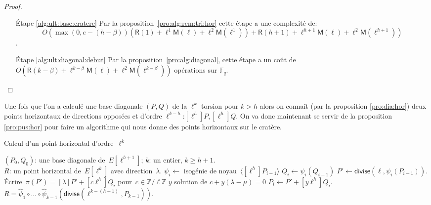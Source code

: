 \documentclass[10pt,a4paper]{book}
\theoremstyle{plain}
\theoremstyle{definition}
\theoremstyle{definition}
\theoremstyle{definition}
\theoremstyle{definition}
\theoremstyle{remark}
\theoremstyle{remark}
\theoremstyle{definition}
\begin{document}
\begin{proof}
\begin{enumerate}
\item[\'Etape \ref{alg:ult:base:cratere}] Par la proposition~\ref{pro:alg:rem:tri:hor} cette étape a une complexité de: \[O(\max(0,e-(h-\beta))(\mathsf{R}(1)+
\ell^{1}\mathsf{M}(\ell)+\ell^2 \mathsf{M}(\ell^{1}))+\mathsf{R}(h+1)+
\ell^{h+1}\mathsf{M}(\ell)+\ell^2 \mathsf{M}(\ell^{h+1}))\].

\item[\'Etape \ref{alg:ult:diagonal:debut}]	Par la proposition~\ref{pro:alg:diagonal}, cette étape a un coût de $O(\mathsf{R}(k-\beta) + \ell^{k-\beta}\mathsf{M}(\ell) + \ell^2\mathsf{M}(\ell^{k-\beta}) )$ opérations sur $\mathbb{F}_q$.

\end{enumerate}
\end{proof}

Une fois que l'on a calculé une base diagonale $(P,Q)$ de la $\ell^k$ torsion pour $k>h$ alors on connaît (par la proposition \ref{pro:dia:hor}) deux points horizontaux  de directions opposées et d'ordre $\ell^{k-h}$:$[\ell^{h}]P, [\ell^{h}]Q$. On va donc maintenant se servir de la proposition \ref{pro:pus:hor} pour faire un algorithme qui nous donne des points horizontaux sur le cratère.

\begin{algorithm}
\caption{\label{alg:hor:poi}Calcul d'un point horizontal d'ordre~$\ell^k$}
\begin{algorithmic}[1]
\REQUIRE $(P_0, Q_0)$: une base diagonale de~$E[\ell^{h+1}]$; $k$: un entier,
$k \geqslant h + 1$.\\
\ENSURE $R$: un point horizontal de~$E[\ell^k]$ avec direction~$\lambda$.
\STATE $\psi_i \gets $ isogénie de noyau~$\langle [\ell^{h}] P_{i-1} \rangle$
\STATE $Q_{i} \gets \psi_i(Q_{i-1})$
\STATE\label{alg:horizontal:divide} $P' \gets \mathsf{divise}(\ell, \psi_i(P_{i-1}))$.
\STATE\label{alg:horizontal:frob} \'Ecrire~$\pi(P') = [\lambda] P' + [c \ell^{h}] Q_i$ pour~$c \in \mathbb{Z}/\ell\mathbb{Z}$
\STATE $y$ solution de $c+y(\lambda - \mu)=0$
\STATE  $P_{i} \gets P' + [y \ell^h] Q_i$.
\ENDFOR
\RETURN\label{alg:horizontal:final} $R = \widehat{\psi}_1 \circ … \circ \widehat{\psi}_{k-1}
  (\mathsf{divise}( \ell^{k-(h+1)}, P_{k-1}) )$. 
\end{algorithmic}
\end{algorithm}
\end{document}
